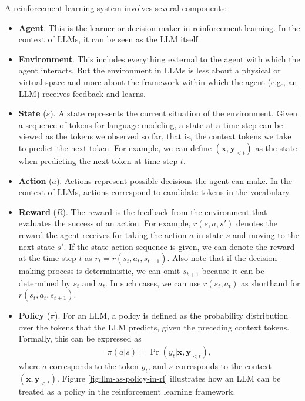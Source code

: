 A reinforcement learning system involves several components:

\begin{itemize}
\item \vspace{0.5em} \textbf{Agent}. This is the learner or decision-maker in reinforcement learning. In the context of LLMs, it can be seen as the LLM itself.
\item \vspace{0.3em} \textbf{Environment}. This includes everything external to the agent with which the agent interacts. But the environment in LLMs is less about a physical or virtual space and more about the framework within which the agent (e.g., an LLM) receives feedback and learns.
\item \vspace{0.3em} \textbf{State} ($s$). A state represents the current situation of the environment. Given a sequence of tokens for language modeling, a state at a time step can be viewed as the tokens we observed so far, that is, the context tokens we take to predict the next token. For example, we can define $(\mathbf{x}, \mathbf{y}_{< t})$ as the state when predicting the next token at time step $t$.
\item \vspace{0.3em} \textbf{Action} ($a$). Actions represent possible decisions the agent can make. In the context of LLMs, actions correspond to candidate tokens in the vocabulary.
\item \vspace{0.3em} \textbf{Reward} ($R$). The reward is the feedback from the environment that evaluates the success of an action. For example, $r(s,a,s')$ denotes the reward the agent receives for taking the action $a$ in state $s$ and moving to the next state $s'$. If the state-action sequence is given, we can denote the reward at the time step $t$ as $r_t = r(s_t,a_t,s_{t+1})$. Also note that if the decision-making process is deterministic, we can omit $s_{t+1}$ because it can be determined by $s_t$ and $a_t$. In such cases, we can use $r(s_t,a_t)$ as shorthand for $r(s_t,a_t,s_{t+1})$.
\item \vspace{0.3em} \textbf{Policy} ($\pi$). For an LLM, a policy is defined as the probability distribution over the tokens that the LLM predicts, given the preceding context tokens. Formally, this can be expressed as
    \begin{eqnarray}
    \pi(a|s) = \Pr(y_t|\mathbf{x}, \mathbf{y}_{< t}),
    \end{eqnarray}
    where $a$ corresponds to the token $y_t$, and $s$ corresponds to the context $(\mathbf{x}, \mathbf{y}_{< t})$. Figure \ref{fig:llm-as-policy-in-rl} illustrates how an LLM can be treated as a policy in the reinforcement learning framework.


\end{itemize}
